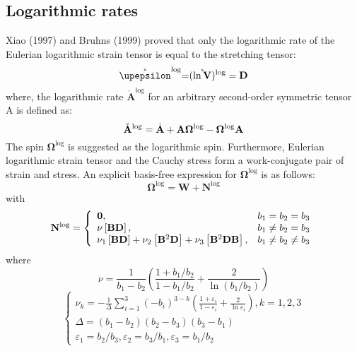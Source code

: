\subsection{Logarithmic rates}
\noindent
Xiao (1997) \cite{xiao1997logarithmic} and Bruhns (1999) \cite{Bruhns1999479} proved that only the logarithmic rate of the Eulerian logarithmic strain tensor is equal to the stretching tensor:
\begin{equation}
{\mathring {\mathbf{\upepsilon }}^{\log }}{\rm{ = }}{( {\mathring {\ln \mathbf{V}}} )^{\log }} = {\mathbf{D}}
\end{equation}
where, the logarithmic rate ${\mathring {\mathbf{A}}^{\log }}$ for an arbitrary second-order symmetric tensor A is defined as:
\begin{equation}
{\mathring {\mathbf{A}}^{\log }} = {\dot {\bf{A}}} + {\mathbf{A}}{{\mathbf{\Omega }}^{\log }} - {{\mathbf{\Omega }}^{\log }}{\mathbf{A}}
\end{equation}
The spin ${{\mathbf{\Omega }}^{\log }}$ is suggested as the logarithmic spin.
Furthermore, Eulerian logarithmic strain tensor and the Cauchy stress form a work-conjugate pair of strain and stress.
An explicit basis-free expression for ${{\mathbf{\Omega }}^{\log }}$ is as follows:
\begin{equation}
{{\bm{\Omega }}^{\log }} = {\mathbf{W}} + {{\mathbf{N}}^{\log }}
\end{equation}
with
\begin{equation}
{{\bf{N}}^{\log }} = \left\{ {\begin{array}{*{20}{l}}
{{\bf{0}},}&{{b_1} = {b_2} = {b_3}}\\
{\nu \left[ {{\bf{BD}}} \right],}&{{b_1} \ne {b_2} = {b_3}}\\
{{\nu _1}\left[ {{\bf{BD}}} \right] + {\nu _2}\left[ {{{\bf{B}}^2}{\bf{D}}} \right] + {\nu _3}\left[ {{{\bf{B}}^2}{\bf{DB}}} \right],}&{{b_1} \ne {b_2} \ne {b_3}}
\end{array}} \right.
\end{equation}
where
\begin{equation}
\nu  = \frac{1}{{{b_1} - {b_2}}}\left( {\frac{{1 + {b_1}/{b_2}}}{{1 - {b_1}/{b_2}}} + \frac{2}{{\ln \left( {{b_1}/{b_2}} \right)}}} \right)
\end{equation}
\begin{equation}
\left\{ {\begin{array}{*{20}{l}}
{{\nu _k} =  - \frac{1}{\Delta }\sum\limits_{i = 1}^3 {{{\left( { - {b_i}} \right)}^{3 - k}}\left( {\frac{{1 + {\varepsilon _i}}}{{1 - {\varepsilon _i}}} + \frac{2}{{\ln {\varepsilon _i}}}} \right)} ,k = 1,2,3}\\
{\Delta  = \left( {{b_1} - {b_2}} \right)\left( {{b_2} - {b_3}} \right)\left( {{b_3} - {b_1}} \right)}\\
{{\varepsilon _1} = {b_2}/{b_3},{\varepsilon _2} = {b_3}/{b_1},{\varepsilon _3} = {b_1}/{b_2}}
\end{array}} \right.
\end{equation}

